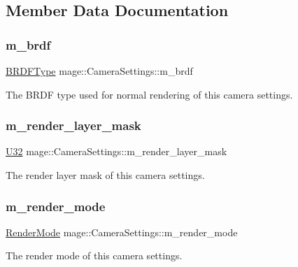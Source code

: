 \subsection{Member Data Documentation}
\hypertarget{structmage_1_1_camera_settings_ac6a51ea7c770af79de4f97b53cab83b7}{}\label{structmage_1_1_camera_settings_ac6a51ea7c770af79de4f97b53cab83b7} 
\subsubsection{\texorpdfstring{m\+\_\+brdf}{m\_brdf}}
{\footnotesize\ttfamily \hyperlink{namespacemage_ae7a7a03a7b34d7e2689689bb8295cd38}{B\+R\+D\+F\+Type} mage\+::\+Camera\+Settings\+::m\+\_\+brdf\hspace{0.3cm}{\ttfamily [private]}}

The B\+R\+DF type used for normal rendering of this camera settings. \hypertarget{structmage_1_1_camera_settings_ad27594c8dc755e0dd8ca55564a4dff8b}{}\label{structmage_1_1_camera_settings_ad27594c8dc755e0dd8ca55564a4dff8b} 
\subsubsection{\texorpdfstring{m\+\_\+render\+\_\+layer\+\_\+mask}{m\_render\_layer\_mask}}
{\footnotesize\ttfamily \hyperlink{namespacemage_a41c104c036fba3756a74e19f793eeaa1}{U32} mage\+::\+Camera\+Settings\+::m\+\_\+render\+\_\+layer\+\_\+mask\hspace{0.3cm}{\ttfamily [private]}}

The render layer mask of this camera settings. \hypertarget{structmage_1_1_camera_settings_aa4d5139b4e8668c58507ead30812c84b}{}\label{structmage_1_1_camera_settings_aa4d5139b4e8668c58507ead30812c84b} 
\subsubsection{\texorpdfstring{m\+\_\+render\+\_\+mode}{m\_render\_mode}}
{\footnotesize\ttfamily \hyperlink{namespacemage_a5e7e18b0154373ce8fc942fe3f6b27fd}{Render\+Mode} mage\+::\+Camera\+Settings\+::m\+\_\+render\+\_\+mode\hspace{0.3cm}{\ttfamily [private]}}

The render mode of this camera settings. 